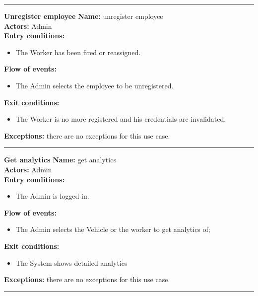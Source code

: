 \begin{center}
\noindent\rule{8cm}{1.0pt}
\end{center}


\textbf{\large Unregister employee}
\bigbreak
\textbf{Name:} unregister employee \\
\textbf{Actors:} Admin \\
\textbf{Entry conditions:} 
\begin{itemize}
\item The Worker has been fired or reassigned.
\end{itemize}
\textbf{Flow of events:} 
\begin{itemize}
\item The Admin selects the employee to be unregistered.
\end{itemize}
\textbf{Exit conditions:} 
\begin{itemize}
\item The Worker is no more registered and his credentials are invalidated.
\end{itemize}
\textbf{Exceptions:} there are no exceptions for this use case.\\


\begin{center}
\noindent\rule{8cm}{1.0pt}
\end{center}


\textbf{\large Get analytics}
\bigbreak
\textbf{Name:} get analytics \\
\textbf{Actors:} Admin \\
\textbf{Entry conditions:} 
\begin{itemize}
\item The Admin is logged in.
\end{itemize}
\textbf{Flow of events:} 
\begin{itemize}
\item The Admin selects the Vehicle or the worker to get analytics of;
\end{itemize}
\textbf{Exit conditions:} 
\begin{itemize}
\item The System shows detailed analytics
\end{itemize}
\textbf{Exceptions:} there are no exceptions for this use case.\\


\begin{center}
\noindent\rule{8cm}{1.0pt}
\end{center}



